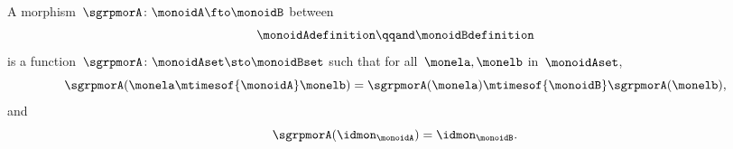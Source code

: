 \begin{ctdefinition}
    \label{def:monoid-mor}
    A morphism~$\sgrpmorA\colon \monoidA \fto \monoidB$ between 
    \begin{equation}
        \monoidAdefinition
        \qqand
        \monoidBdefinition
    \end{equation}
    is a function~$\sgrpmorA \colon \monoidAset \sto \monoidBset$ such that for all~$\monela, \monelb$ in~$\monoidAset$,
    \begin{equation}
        \label{eq:mon-mor-comp}
        \sgrpmorA (\monela \mtimesof{\monoidA} \monelb) = \sgrpmorA (\monela) \mtimesof{\monoidB} \sgrpmorA(\monelb),
    \end{equation}
    and
    \begin{equation}
        \label{eq:mon-id-comp}
        \sgrpmorA (\idmon_\monoidA) = \idmon_{\monoidB}.
    \end{equation}
\end{ctdefinition}
